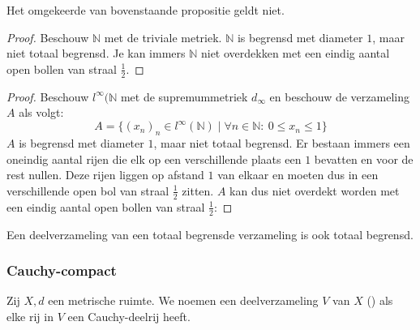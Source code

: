 \documentclass[main.tex]{subfiles}
\begin{document}
\begin{tvb}
  Het omgekeerde van bovenstaande propositie geldt niet.

  \begin{proof}
    Beschouw $\mathbb{N}$ met de triviale metriek.
    $\mathbb{N}$ is begrensd met diameter $1$, maar niet totaal begrensd.
    Je kan immers $\mathbb{N}$ niet overdekken met een eindig aantal open bollen van straal $\frac{1}{2}$.
  \end{proof}
  \begin{proof}
    Beschouw $l^{\infty}(\mathbb{N}$ met de supremummetriek $d_{\infty}$ en beschouw de verzameling $A$ als volgt:
    \[ A = \{ (x_{n})_{n} \in l^{\infty}(\mathbb{N}) \mid \forall n\in \mathbb{N}:\ 0 \le x_{n} \le 1 \} \]
    $A$ is begrensd met diameter $1$, maar niet totaal begrensd.
    Er bestaan immers een oneindig aantal rijen die elk op een verschillende plaats een $1$ bevatten en voor de rest nullen.
    Deze rijen liggen op afstand $1$ van elkaar en moeten dus in een verschillende open bol van straal $\frac{1}{2}$ zitten.
    $A$ kan dus niet overdekt worden met een eindig aantal open bollen van straal $\frac{1}{2}$:
  \end{proof}
\end{tvb}

\begin{st}
  \label{st:deelverzameling-van-totaal-begrensd-ook-totaal-begrensd}
  Een deelverzameling van een totaal begrensde verzameling is ook totaal begrensd.
\end{st}

\subsubsection{Cauchy-compact}
\label{sec:cauchy-compact}

\begin{de}
  Zij $X,d$ een metrische ruimte.
  We noemen een deelverzameling $V$ van $X$  () als elke rij in $V$ een Cauchy-deelrij heeft.
\end{de}
\end{document}
